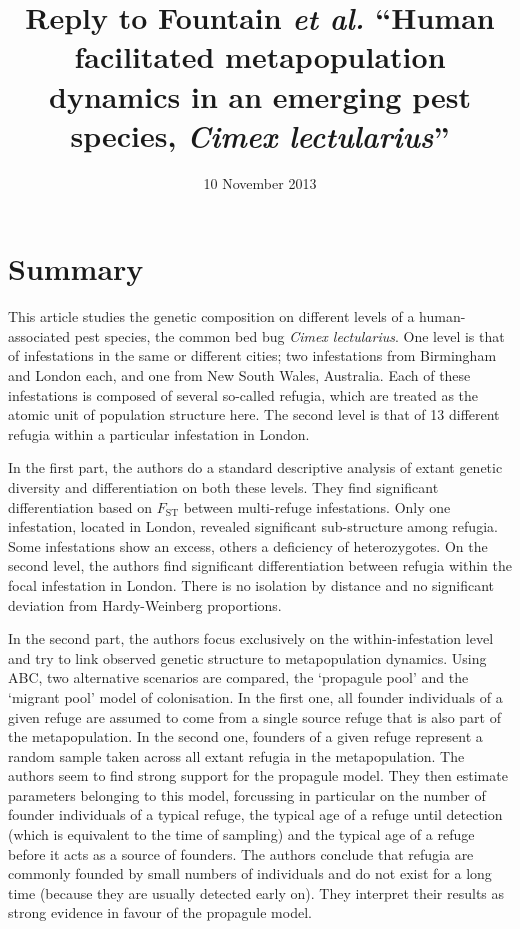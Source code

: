 \documentclass[11pt]{article}
\title{Reply to Fountain \emph{et al.} ``Human facilitated metapopulation dynamics in an emerging pest species, \emph{Cimex lectularius}''}
\date{10 November 2013}                                           %
\begin{document}
\maketitle

\section{Summary}
This article studies the genetic composition on different levels of a human-associated pest species, the common bed bug \emph{Cimex lectularius}. One level is that of infestations in the same or different cities; two infestations from Birmingham and London each, and one from New South Wales, Australia. Each of these infestations is composed of several so-called refugia, which are treated as the atomic unit of population structure here. The second level is that of 13 different refugia within a particular infestation in London.

In the first part, the authors do a standard descriptive analysis of extant genetic diversity and differentiation on both these levels. They find significant differentiation based on $F_{\mathrm{ST}}$ between multi-refuge infestations. Only one infestation, located in London, revealed significant sub-structure among refugia. Some infestations show an excess, others a deficiency of heterozygotes. On the second level, the authors find significant differentiation between refugia within the focal infestation in London. There is no isolation by distance and no significant deviation from Hardy-Weinberg proportions.

In the second part, the authors focus exclusively on the within-infestation level and try to link observed genetic structure to metapopulation dynamics. Using ABC, two alternative scenarios are compared, the `propagule pool' and the `migrant pool' model of colonisation. In the first one, all founder individuals of a given refuge are assumed to come from a single source refuge that is also part of the metapopulation. In the second one, founders of a given refuge represent a random sample taken across all extant refugia in the metapopulation. The authors seem to find strong support for the propagule model. They then estimate parameters belonging to this model, forcussing in particular on the number of founder individuals of a typical refuge, the typical age of a refuge until detection (which is equivalent to the time of sampling) and the typical age of a refuge before it acts as a source of founders. The authors conclude that refugia are commonly founded by small numbers of individuals and do not exist for a long time (because they are usually detected early on). They interpret their results as strong evidence in favour of the propagule model.
\end{document}
